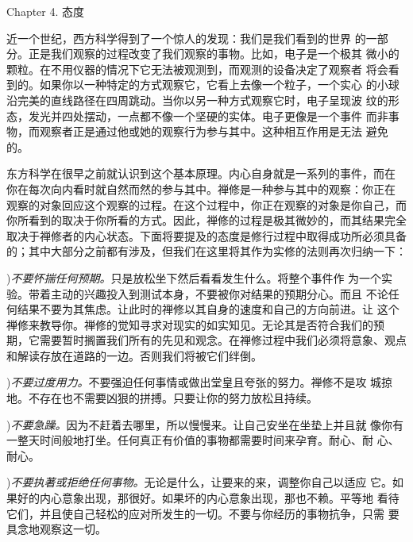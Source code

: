 


\beginchapter Chapter 4. 态度


{
\parindent=3pc
\noindent\hang{}
\1%
{近一个世纪}，西方科学得到了一个惊人的发现：我们是我们看到的世界
的一部分。正是我们观察的过程改变了我们观察的事物。比如，电子是一个极其
微小的颗粒。在不用仪器的情况下它无法被观测到，而观测的设备决定了观察者
将会看到的。如果你以一种特定的方式观察它，它看上去像一个粒子，一个实心
的小球沿完美的直线路径在四周跳动。当你以另一种方式观察它时，电子呈现波
纹的形态，发光并四处摆动，一点都不像一个坚硬的实体。电子更像是一个事件
而非事物，而观察者正是通过他或她的观察行为参与其中。这种相互作用是无法
避免的。

}

东方科学在很早之前就认识到这个基本原理。内心自身就是一系列的事件，而在
你在每次向内看时就自然而然的参与其中。禅修是一种参与其中的观察：你正在
观察的对象回应这个观察的过程。在这个过程中，你正在观察的对象是你自己，而
你所看到的取决于你所看的方式。因此，禅修的过程是极其微妙的，而其结果完全
取决于禅修者的内心状态。下面将要提及的态度是修行过程中取得成功所必须具备
的；其中大部分之前都有涉及，但我们在这里将其作为实修的法则再次归纳一下：

\medbreak
{}){\it 不要怀揣任何预期。}只是放松坐下然后看看发生什么。将整个事件作
为一个实验。带着主动的兴趣投入到测试本身，不要被你对结果的预期分心。而且
不论任何结果不要为其焦虑。让此时的禅修以其自身的速度和自己的方向前进。让
这个禅修来教导你。禅修的觉知寻求对现实的如实知见。无论其是否符合我们的预
期，它需要暂时搁置我们所有的先见和观念。在禅修过程中我们必须将意象、观点
和解读存放在道路的一边。否则我们将被它们绊倒。

){\it 不要过度用力。}不要强迫任何事情或做出堂皇且夸张的努力。禅修不是攻
城掠地。不存在也不需要凶狠的拼搏。只要让你的努力放松且持续。

){\it 不要急躁。}因为不赶着去哪里，所以慢慢来。让自己安坐在坐垫上并且就
像你有一整天时间般地打坐。任何真正有价值的事物都需要时间来孕育。耐心、耐
心、耐心。

){\it 不要执著或拒绝任何事物。}无论是什么，让要来的来，调整你自己以适应
它。如果好的内心意象出现，那很好。如果坏的内心意象出现，那也不赖。平等地
看待它们，并且使自己轻松的应对所发生的一切。不要与你经历的事物抗争，只需
要具念地观察这一切。


